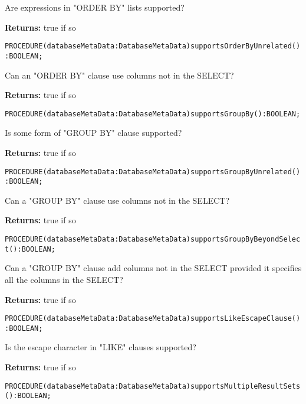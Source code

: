 Are expressions in "ORDER BY" lists supported? 


{\bf Returns: } 
true if so 




\verb'PROCEDURE(databaseMetaData:DatabaseMetaData)supportsOrderByUnrelated():BOOLEAN;'






Can an "ORDER BY" clause use columns not in the SELECT? 


{\bf Returns: } 
true if so 




\verb'PROCEDURE(databaseMetaData:DatabaseMetaData)supportsGroupBy():BOOLEAN;'






Is some form of "GROUP BY" clause supported? 


{\bf Returns: } 
true if so 




\verb'PROCEDURE(databaseMetaData:DatabaseMetaData)supportsGroupByUnrelated():BOOLEAN;'






Can a "GROUP BY" clause use columns not in the SELECT? 


{\bf Returns: } 
true if so 




\verb'PROCEDURE(databaseMetaData:DatabaseMetaData)supportsGroupByBeyondSelect():BOOLEAN;'






Can a "GROUP BY" clause add columns not in the SELECT provided it specifies all the columns in the SELECT? 


{\bf Returns: } 
true if so 




\verb'PROCEDURE(databaseMetaData:DatabaseMetaData)supportsLikeEscapeClause():BOOLEAN;'






Is the escape character in "LIKE" clauses supported?


{\bf Returns: } 
true if so 




\verb'PROCEDURE(databaseMetaData:DatabaseMetaData)supportsMultipleResultSets():BOOLEAN;'






